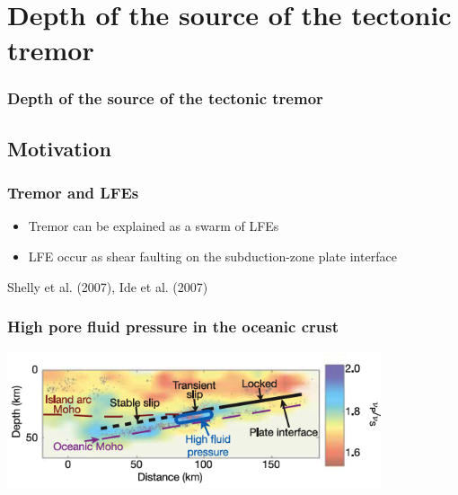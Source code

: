 \documentclass{beamer}
\begin{document}
				
	\section{Depth of the source of the tectonic tremor}

	\begin{frame}
		\frametitle{Depth of the source of the tectonic tremor}
	\end{frame}

	\subsection{Motivation}

	\begin{frame}
		\frametitle{Tremor and LFEs}
		\begin{itemize}
			\item Tremor can be explained as a swarm of LFEs
			\item LFE occur as shear faulting on the subduction-zone plate interface
		\end{itemize}

		Shelly et al. (2007), Ide et al. (2007)
	\end{frame}

	\begin{frame}
		\frametitle{High pore fluid pressure in the oceanic crust}
		\begin{center}
			\includegraphics[trim={0cm 0cm 0cm 0cm}, clip, width=11cm]{articles/shelly_al_2006_4d.png}
		\end{center}
	\end{frame}
\end{document}

